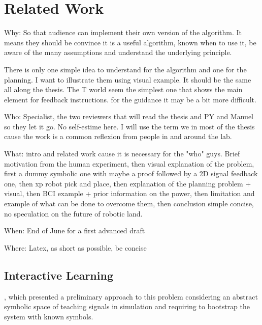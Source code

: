 
\chapter{Related Work}
\label{chapter:relatedwork}
\minitoc


Why: So that audience can implement their own version of the algorithm. It means they should be convince it is a useful algorithm, known when to use it, be aware of the many assumptions and understand the underlying principle. 

There is only one simple idea to understand for the algorithm and one for the planning. I want to illustrate them using visual example. It should be the same all along the thesis. The T world seem the simplest one that shows the main element for feedback instructions. for the guidance it may be a bit more difficult.

Who: Specialist, the two reviewers that will read the thesis and PY and Manuel so they let it go. No self-estime here. I will use the term we in most of the thesis cause the work is a common reflexion from people in and around the lab.

What: intro and related work cause it is necessary for the "who" guys. Brief motivation from the human experiment, then visual explanation of the problem, first a dummy symbolic one with maybe a proof followed by a 2D signal feedback one, then xp robot pick and place, then explanation of the planning problem + visual, then BCI example + prior information on the power, then limitation and example of what can be done to overcome them, then conclusion simple concise, no speculation on the future of robotic land.

When: End of June for a first advanced draft

Where: Latex, as short as possible, be concise

\section{Interactive Learning}

\cite{macl11simul}, which presented a preliminary approach to this problem considering an abstract symbolic space of teaching signals in simulation and requiring to bootstrap the system with known symbols. 

